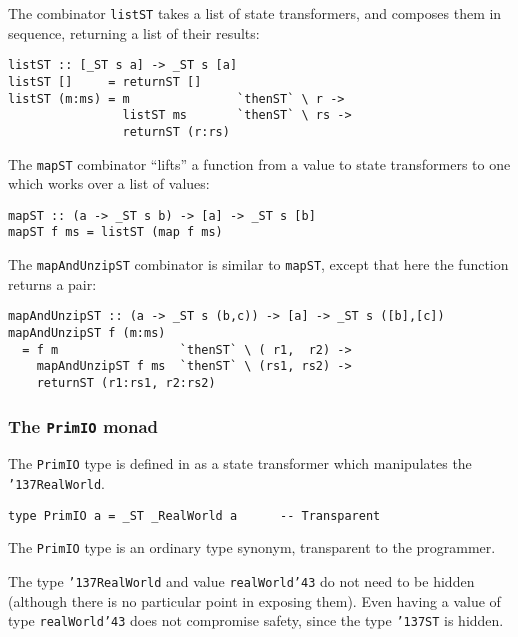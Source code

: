 The combinator \mbox{\tt listST} takes a list of state transformers, and
composes them in sequence, returning a list of their results:
\begin{verbatim}
listST :: [_ST s a] -> _ST s [a]
listST []     = returnST []
listST (m:ms) = m               `thenST` \ r ->
                listST ms       `thenST` \ rs ->
                returnST (r:rs)
\end{verbatim}
The \mbox{\tt mapST} combinator ``lifts'' a function from a value to state
transformers to one which works over a list of values:
\begin{verbatim}
mapST :: (a -> _ST s b) -> [a] -> _ST s [b]
mapST f ms = listST (map f ms)
\end{verbatim}
The \mbox{\tt mapAndUnzipST} combinator is similar to \mbox{\tt mapST}, except that here the
function returns a pair:
\begin{verbatim}
mapAndUnzipST :: (a -> _ST s (b,c)) -> [a] -> _ST s ([b],[c])
mapAndUnzipST f (m:ms)
  = f m                 `thenST` \ ( r1,  r2) ->
    mapAndUnzipST f ms  `thenST` \ (rs1, rs2) ->
    returnST (r1:rs1, r2:rs2)
\end{verbatim}

\subsubsection{The \mbox{\tt PrimIO} monad}
\label{sect:io-spec}

The \mbox{\tt PrimIO} type is defined in as a state transformer which manipulates the 
\mbox{\tt {\char'137}RealWorld}.
\begin{verbatim}
type PrimIO a = _ST _RealWorld a      -- Transparent
\end{verbatim}
The \mbox{\tt PrimIO} type is an ordinary type synonym, transparent to the programmer.

The type \mbox{\tt {\char'137}RealWorld} and value \mbox{\tt realWorld{\char'43}} do not need to be hidden (although 
there is no particular point in exposing them).  Even having a value of type 
\mbox{\tt realWorld{\char'43}} does not compromise safety, since the type \mbox{\tt {\char'137}ST} is hidden. 

